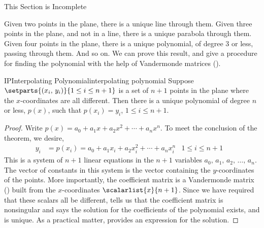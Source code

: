 %
{\sc\large This Section is Incomplete}\par\bigskip
%
Given two points in the plane, there is a unique line through them.  Given three points in the plane, and not in a line, there is a unique parabola through them.  Given four points in the plane, there is a unique polynomial, of degree 3 or less, passing through them.  And so on.  We can prove this result, and give a procedure for finding the polynomial with the help of Vandermonde matrices ().
%
\begin{theorem}{IP}{Interpolating Polynomial}{interpolating polynomial}
Suppose $\setparts{(x_i,\,y_i)}{1\leq i\leq n+1}$ is a set of $n+1$ points in the plane where the $x$-coordinates are all different.  Then there is a unique polynomial of degree $n$ or less, $p(x)$, such that $p(x_i)=y_i$, $1\leq i\leq n+1$.
\end{theorem}
%
\begin{proof}
Write $p(x)=a_0+a_1x+a_2x^2+\cdots+a_nx^n$.  To meet the conclusion of the theorem, we desire,
%
\begin{align*}
y_i&=p(x_i)=a_0+a_1x_i+a_2x_i^2+\cdots+a_nx_i^n
&
1\leq i\leq n+1&
\end{align*}
%
This is a system of $n+1$ linear equations in the $n+1$ variables $a_0,\,a_1,\,a_2,\,\ldots,\,a_n$.  The vector of constants in this system is the vector containing the $y$-coordinates of the points.   More importantly, the coefficient matrix is a Vandermonde matrix () built from the $x$-coordinates $\scalarlist{x}{n+1}$.  Since we have required that these scalars all be different,  tells us that the coefficient matrix is nonsingular and
 says the solution for the coefficients of the polynomial exists, and is unique.  As a practical matter,  provides an expression for the solution.
%
\end{proof}
%
%
